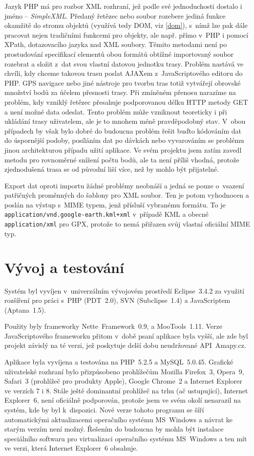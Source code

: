 Jazyk PHP má pro rozbor XML rozhraní, jež podle své jednoduchosti dostalo i jméno
-- {\it SimpleXML}. Předaný řetězec nebo soubor rozebere jediná funkce
okamžitě do stromu objektů (využívá tedy DOM, viz \ref{dom}), s~nímž
lze pak dále pracovat nejen tradičními funkcemi pro objekty, ale
např. přímo v~PHP i pomocí XPath, dotazovacího jazyka nad XML
soubory. Těmito metodami není po prostudování specifikací elementů
obou formátů obtížné importovaný soubor rozebrat a složit z~dat svou
vlastní datovou jednotku trasy. Problém nastává ve chvíli, kdy chceme
takovou trasu poslat AJAXem z~JavaScriptového editoru do PHP. GPS
navigace nebo jiné nástroje pro tvorbu tras totiž vytvářejí obrovské množství
bodů za účelem přesnosti trasy. Při zmíněném přenosu narazíme na
problém, kdy vzniklý řetězec přesahuje podporovanou délku HTTP metody
GET a není možné data odeslat. Tento problém může vzniknout
teoreticky i při ukládání trasy uživatelem, ale je to mnohem méně
pravděpodobný stav. V~obou případech by však bylo dobré do
budoucna problém řešit buďto kódováním dat do úspornější podoby,
posíláním dat po dávkách nebo vyvarováním se problému jinou architekturou případu užití
aplikace. Ve svém projektu jsem zatím zavedl metodu pro rovnoměrné
snížení počtu bodů, ale ta není příliš vhodná, protože zjednodušená
trasa se od původní liší více, než by mohlo být přijatelné.

Export dat oproti importu žádné problémy neobnáší a jedná se pouze
o~vsazení patřičných proměnných do šablony pro XML soubor. Ten je
potom vyhodnocen a poslán na výstup s~MIME typem, jenž přísluší
vybranému formátu. To je {\tt application/vnd.google-earth.kml+xml}
v~případě KML a obecné {\tt application/xml} pro GPX, protože to nemá
přiřazen svůj vlastní oficiální MIME typ.

\chapter{Vývoj a testování}
Systém byl vyvíjen v~univerzálním vývojovém prostředí Eclipse~3.4.2 za
využití rozšíření pro práci s~PHP (PDT~2.0), SVN (Subclipse~1.4) a
JavaScriptem (Aptana~1.5).

Použity byly frameworky Nette~Framework~0.9, a MooTools~1.11. Verze
JavaScriptového frameworku přitom v~době psaní aplikace byla vyšší,
ale zde byl projekt závislý na té verzi, jež poskytuje delší dobu
neudržované API~Amapy.cz.

Aplikace byla vyvíjena a testována na PHP~5.2.5 a MySQL~5.0.45.
Grafické uživatelské rozhraní bylo přizpůsobeno prohlížečům
Mozilla Firefox~3, Opera~9, Safari~3 (prohlížeč pro produkty Apple),
Google Chrome~2 a Internet Explorer ve verzích 7 i 8. Stále ještě
dominantní prohlížeč na trhu (ač ustupující), Internet Explorer~6,
není oficiálně podporován, protože jsem ve svém okolí nenarazil na
systém, kde by byl k~dispozici. Nové verze tohoto programu se šíří
automatickými aktualizacemi operačního systému MS~Windows a návrat ke
starým verzím není možný. Řešením do budoucna by mohla být instalace
speciálního softwaru pro virtualizaci operačního systému MS~Windows a
ten mít ve verzi, která Internet Explorer~6 obsahuje.

